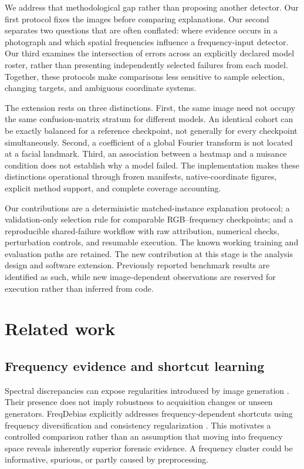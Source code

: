 \documentclass[conference,10pt,letterpaper]{IEEEtran}
\begin{document}
We address that methodological gap rather than proposing another detector. Our first protocol fixes the images before comparing explanations. Our second separates two questions that are often conflated: where evidence occurs in a photograph and which spatial frequencies influence a frequency-input detector. Our third examines the intersection of errors across an explicitly declared model roster, rather than presenting independently selected failures from each model. Together, these protocols make comparisons less sensitive to sample selection, changing targets, and ambiguous coordinate systems.

The extension rests on three distinctions. First, the same image need not occupy the same confusion-matrix stratum for different models. An identical cohort can be exactly balanced for a reference checkpoint, not generally for every checkpoint simultaneously. Second, a coefficient of a global Fourier transform is not located at a facial landmark. Third, an association between a heatmap and a nuisance condition does not establish why a model failed. The implementation makes these distinctions operational through frozen manifests, native-coordinate figures, explicit method support, and complete coverage accounting.

Our contributions are a deterministic matched-instance explanation protocol; a validation-only selection rule for comparable RGB--frequency checkpoints; and a reproducible shared-failure workflow with raw attribution, numerical checks, perturbation controls, and resumable execution. The known working training and evaluation paths are retained. The new contribution at this stage is the analysis design and software extension. Previously reported benchmark results are identified as such, while new image-dependent observations are reserved for execution rather than inferred from code.

\section{Related work}
\subsection{Frequency evidence and shortcut learning}
Spectral discrepancies can expose regularities introduced by image generation \cite{frank2020}. Their presence does not imply robustness to acquisition changes or unseen generators. FreqDebias explicitly addresses frequency-dependent shortcuts using frequency diversification and consistency regularization \cite{kashiani2025}. This motivates a controlled comparison rather than an assumption that moving into frequency space reveals inherently superior forensic evidence. A frequency cluster could be informative, spurious, or partly caused by preprocessing.
\end{document}
